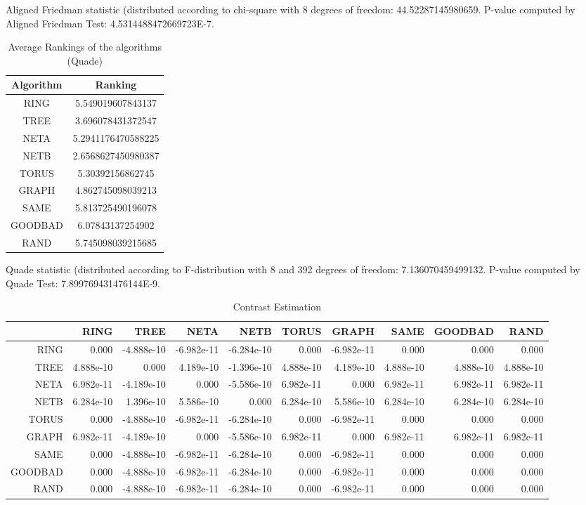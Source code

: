 \documentclass[a4paper,10pt]{article}
\begin{document}
\begin{landscape}
Aligned Friedman statistic (distributed according to chi-square with 8 degrees of freedom: 44.52287145980659. 
P-value computed by Aligned Friedman Test: 4.5314488472669723E-7.\newline


\newpage

\begin{table}[!htp]
\centering
\caption{Average Rankings of the algorithms (Quade)
}\begin{tabular}{c|c}
Algorithm&Ranking\\
\hline
 RING&5.549019607843137\\
 TREE&3.696078431372547\\
 NETA&5.2941176470588225\\
 NETB&2.6568627450980387\\
 TORUS&5.30392156862745\\
 GRAPH&4.862745098039213\\
 SAME&5.813725490196078\\
 GOODBAD&6.07843137254902\\
 RAND&5.745098039215685\\
\end{tabular}
\end{table}
Quade statistic (distributed according to F-distribution with 8 and 392 degrees of freedom: 7.136070459499132. 
P-value computed by Quade Test: 7.899769431476144E-9.\newline


\newpage

\begin{table}[!htp]
\centering\tiny
\caption{Contrast Estimation}
\begin{tabular}{
|r|r|r|r|r|r|r|r|r|r|}
\hline
 & RING& TREE& NETA& NETB& TORUS& GRAPH& SAME& GOODBAD& RAND\\
\hline
 RING&0.000&-4.888e-10&-6.982e-11&-6.284e-10&0.000&-6.982e-11&0.000&0.000&0.000\\
\hline
 TREE&4.888e-10&0.000&4.189e-10&-1.396e-10&4.888e-10&4.189e-10&4.888e-10&4.888e-10&4.888e-10\\
\hline
 NETA&6.982e-11&-4.189e-10&0.000&-5.586e-10&6.982e-11&0.000&6.982e-11&6.982e-11&6.982e-11\\
\hline
 NETB&6.284e-10&1.396e-10&5.586e-10&0.000&6.284e-10&5.586e-10&6.284e-10&6.284e-10&6.284e-10\\
\hline
 TORUS&0.000&-4.888e-10&-6.982e-11&-6.284e-10&0.000&-6.982e-11&0.000&0.000&0.000\\
\hline
 GRAPH&6.982e-11&-4.189e-10&0.000&-5.586e-10&6.982e-11&0.000&6.982e-11&6.982e-11&6.982e-11\\
\hline
 SAME&0.000&-4.888e-10&-6.982e-11&-6.284e-10&0.000&-6.982e-11&0.000&0.000&0.000\\
\hline
 GOODBAD&0.000&-4.888e-10&-6.982e-11&-6.284e-10&0.000&-6.982e-11&0.000&0.000&0.000\\
\hline
 RAND&0.000&-4.888e-10&-6.982e-11&-6.284e-10&0.000&-6.982e-11&0.000&0.000&0.000\\
\hline


\end{tabular}
\end{table}
\end{landscape}
\end{document}
